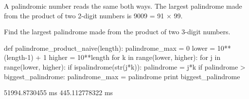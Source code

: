 
\begin{ProjectEuler}{4}
A palindromic number reads the same both ways. The largest palindrome made from the product of two 2-digit numbers is 9009 = 91 × 99.

Find the largest palindrome made from the product of two 3-digit numbers.
\end{ProjectEuler}

\begin{pythoncode}
def palindrome_product_naive(length):
    palindrome_max = 0
    lower = 10**(length-1) + 1
    higher = 10**length
    for k in range(lower, higher):
        for j in range(lower, higher):
            if ispalindrome(str(j*k)):
                palindrome = j*k 
                if palindrome > biggest_palindrome:
                    palindrome_max = palindrome
    print biggest_palindrome
\end{pythoncode}

51994.8730455 ms
445.112778322 ms